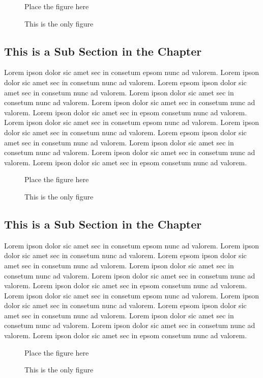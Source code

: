 \begin{figure}
Place the figure here
\caption{This is the only figure}
\end{figure}

\subsection{This is a Sub Section in the Chapter}
Lorem ipson dolor sic amet sec in consetum epsom nunc ad valorem. Lorem ipson dolor sic amet
sec in consetum nunc ad valorem. Lorem epsom ipson dolor sic amet sec in consetum nunc ad valorem. 
Lorem ipson dolor sic amet sec in consetum nunc ad valorem. Lorem ipson dolor sic amet
sec in consetum nunc ad valorem. Lorem ipson dolor sic amet sec in epsom consetum nunc ad valorem.
Lorem ipson dolor sic amet sec in consetum epsom nunc ad valorem. Lorem ipson dolor sic amet
sec in consetum nunc ad valorem. Lorem epsom ipson dolor sic amet sec in consetum nunc ad valorem. 
Lorem ipson dolor sic amet sec in consetum nunc ad valorem. Lorem ipson dolor sic amet
sec in consetum nunc ad valorem. Lorem ipson dolor sic amet sec in epsom consetum nunc ad valorem.

\begin{figure}
Place the figure here
\caption{This is the only figure}
\end{figure}

\subsection{This is a Sub Section in the Chapter}
Lorem ipson dolor sic amet sec in consetum epsom nunc ad valorem. Lorem ipson dolor sic amet
sec in consetum nunc ad valorem. Lorem epsom ipson dolor sic amet sec in consetum nunc ad valorem. 
Lorem ipson dolor sic amet sec in consetum nunc ad valorem. Lorem ipson dolor sic amet
sec in consetum nunc ad valorem. Lorem ipson dolor sic amet sec in epsom consetum nunc ad valorem.
Lorem ipson dolor sic amet sec in consetum epsom nunc ad valorem. Lorem ipson dolor sic amet
sec in consetum nunc ad valorem. Lorem epsom ipson dolor sic amet sec in consetum nunc ad valorem. 
Lorem ipson dolor sic amet sec in consetum nunc ad valorem. Lorem ipson dolor sic amet
sec in consetum nunc ad valorem. Lorem ipson dolor sic amet sec in epsom consetum nunc ad valorem.
 \begin{figure}
Place the figure here
\caption{This is the only figure}
\end{figure}


